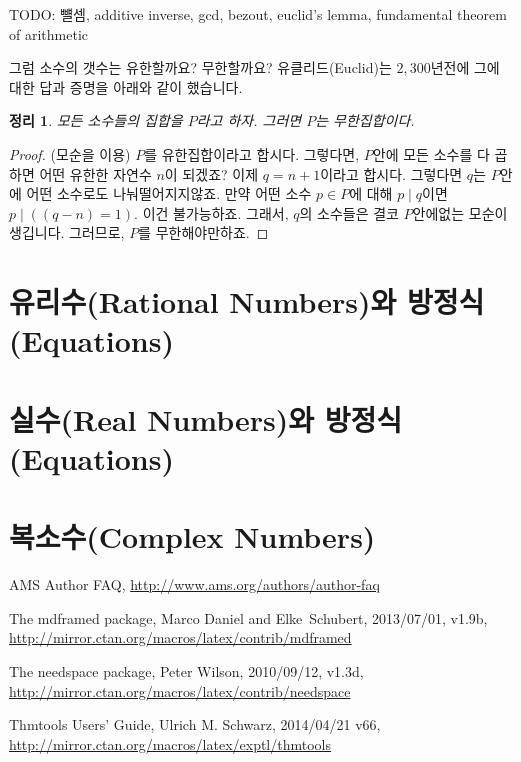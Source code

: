 \documentclass[a4paper, 11pt]{report}
\newcommand{\ntt}{%
  \fontfamily\ttdefault \fontseries\mddefault \fontshape\updefault
  \selectfont
}
\DeclareRobustCommand{\pkg}[1]{{\ntt#1}}
\renewcommand{\<}{\langle}
\renewcommand{\>}{\rangle}
\newtheorem{thm}{정리}[section]
\begin{document}
TODO: 뺼셈, additive inverse, gcd, bezout, euclid's lemma, fundamental theorem of arithmetic


그럼 소수의 갯수는 유한할까요? 무한할까요? 유클리드(Euclid)는 $2,300$년전에 그에 대한 답과
증명을 아래와 같이 했습니다.

\begin{thm}
  모든 소수들의 집합을 $P$라고 하자. 그러면 $P$는 무한집합이다. 
\end{thm}

\begin{proof}
  (모순을 이용) $P$를 유한집합이라고 합시다. 그렇다면, $P$안에 모든 소수를 다 곱하면 어떤 유한한 
  자연수 $n$이 되겠죠? 이제 $q = n+1$이라고 합시다. 그렇다면 $q$는 $P$안에 어떤 소수로도 나눠떨어지지않죠.
  만약 어떤 소수 $p \in P$에 대해 $p \mid q$이면 $p \mid ((q-n) = 1)$. 이건 불가능하죠.
  그래서, $q$의 소수들은 결코 $P$안에없는 모순이 생깁니다. 그러므로, $P$를 무한해야만하죠.
\end{proof}

\section{유리수(Rational Numbers)와 방정식(Equations)}

\section{실수(Real Numbers)와 방정식(Equations)}

\section{복소수(Complex Numbers)} 




\begin{thebibliography}{[MDF]}

\raggedright

 AMS Author FAQ,
  \url{http://www.ams.org/authors/author-faq}

 The \pkg{mdframed} package,
  Marco Daniel and Elke~Schubert, 2013/07/01, v1.9b,
  \url{http://mirror.ctan.org/macros/latex/contrib/mdframed}

 The \pkg{needspace} package,
  Peter Wilson, 2010/09/12, v1.3d,
  \url{http://mirror.ctan.org/macros/latex/contrib/needspace}

 \pkg{Thmtools} Users' Guide,
  Ulrich M. Schwarz, 2014/04/21 v66,
  \url{http://mirror.ctan.org/macros/latex/exptl/thmtools}

\end{thebibliography}
\end{document}
